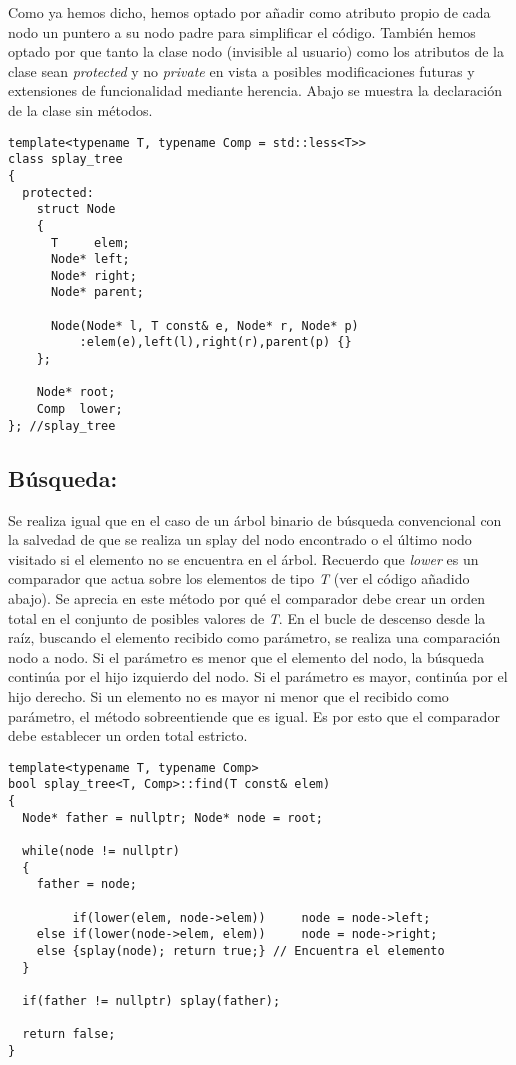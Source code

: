 \documentclass[letterpaper,12pt]{article}
\begin{document}
Como ya hemos dicho, hemos optado por añadir como atributo propio de cada nodo
un puntero a su nodo padre para simplificar el código. También hemos optado
por que tanto la clase nodo (invisible al usuario) como los atributos de la 
clase sean \textit{protected} y no \textit{private} en vista a posibles 
modificaciones futuras y extensiones de funcionalidad mediante herencia. Abajo
se muestra la declaración de la clase sin métodos.

\begin{lstlisting}
template<typename T, typename Comp = std::less<T>>
class splay_tree
{
  protected:
    struct Node
    {
      T     elem;
      Node* left;
      Node* right;
      Node* parent;

      Node(Node* l, T const& e, Node* r, Node* p) 
          :elem(e),left(l),right(r),parent(p) {}
    };

    Node* root;
    Comp  lower;
}; //splay_tree
\end{lstlisting}
\subsection{Búsqueda:}

Se realiza igual que en el caso de un árbol binario de búsqueda convencional 
con la salvedad de que se realiza un splay del nodo encontrado o el último 
nodo visitado si el elemento no se encuentra en el árbol. Recuerdo que 
\textit{lower} es un comparador que actua sobre los elementos de tipo 
\textit{T} (ver el código añadido abajo). Se aprecia en este método por qué el comparador debe crear un orden total en el conjunto de posibles valores de 
\textit{T}. En el bucle de descenso desde la raíz, buscando el elemento 
recibido como parámetro, se realiza una comparación nodo a nodo. Si el 
parámetro es menor que el elemento del nodo, la búsqueda continúa por el hijo 
izquierdo del nodo. Si el parámetro es mayor, continúa por el hijo derecho. Si un elemento no es mayor ni menor que el recibido como parámetro, el método 
sobreentiende que es igual. Es por esto que el comparador debe establecer un 
orden total estricto. 

\begin{lstlisting}
template<typename T, typename Comp>
bool splay_tree<T, Comp>::find(T const& elem)
{
  Node* father = nullptr; Node* node = root;

  while(node != nullptr)
  {
    father = node;

         if(lower(elem, node->elem))     node = node->left;
    else if(lower(node->elem, elem))     node = node->right;
    else {splay(node); return true;} // Encuentra el elemento
  }

  if(father != nullptr) splay(father);

  return false;
}
\end{lstlisting}
\end{document}

